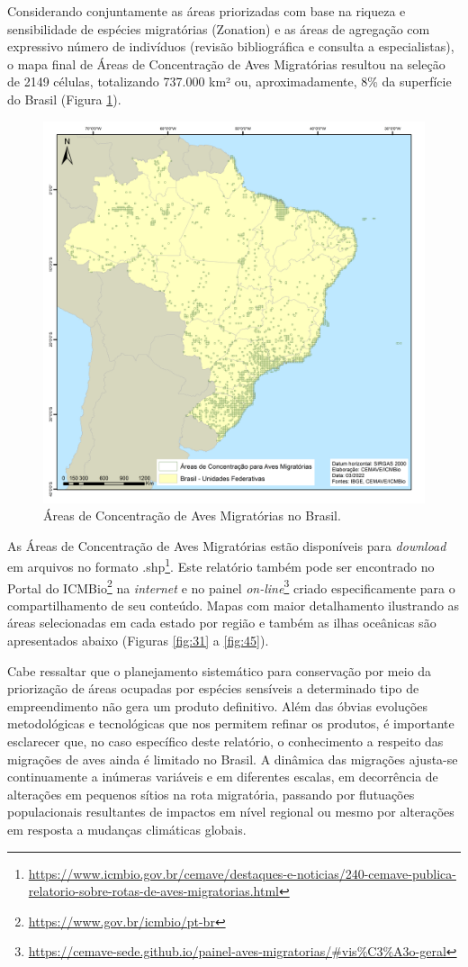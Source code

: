 \documentclass[
  oneside]{scrbook}
\DeclareRobustCommand{\href}[2]{#2\footnote{\url{#1}}}
\begin{document}
Considerando conjuntamente as áreas priorizadas com base na riqueza e sensibilidade de espécies migratórias (Zonation) e as áreas de agregação com expressivo número de indivíduos (revisão bibliográfica e consulta a especialistas), o mapa final de Áreas de Concentração de Aves Migratórias resultou na seleção de 2149 células, totalizando 737.000 km² ou, aproximadamente, 8\% da superfície do Brasil (Figura \ref{fig:30}).

\begin{figure}[H]

{\centering \includegraphics[width=0.75\linewidth]{imagens/cap07/Figura_7.10} 

}

\caption{Áreas de Concentração de Aves Migratórias no Brasil.}\label{fig:30}
\end{figure}

As Áreas de Concentração de Aves Migratórias estão disponíveis para \emph{download} em \href{https://www.icmbio.gov.br/cemave/destaques-e-noticias/240-cemave-publica-relatorio-sobre-rotas-de-aves-migratorias.html}{arquivos no formato .shp}. Este relatório também pode ser encontrado no \href{https://www.gov.br/icmbio/pt-br}{Portal do ICMBio} na \emph{internet} e no \href{https://cemave-sede.github.io/painel-aves-migratorias/\#vis\%C3\%A3o-geral}{painel \emph{on-line}} criado especificamente para o compartilhamento de seu conteúdo. Mapas com maior detalhamento ilustrando as áreas selecionadas em cada estado por região e também as ilhas oceânicas são apresentados abaixo (Figuras \ref{fig:31} a \ref{fig:45}).

Cabe ressaltar que o planejamento sistemático para conservação por meio da priorização de áreas ocupadas por espécies sensíveis a determinado tipo de empreendimento não gera um produto definitivo. Além das óbvias evoluções metodológicas e tecnológicas que nos permitem refinar os produtos, é importante esclarecer que, no caso específico deste relatório, o conhecimento a respeito das migrações de aves ainda é limitado no Brasil. A dinâmica das migrações ajusta-se continuamente a inúmeras variáveis e em diferentes escalas, em decorrência de alterações em pequenos sítios na rota migratória, passando por flutuações populacionais resultantes de impactos em nível regional ou mesmo por alterações em resposta a mudanças climáticas globais.
\end{document}
